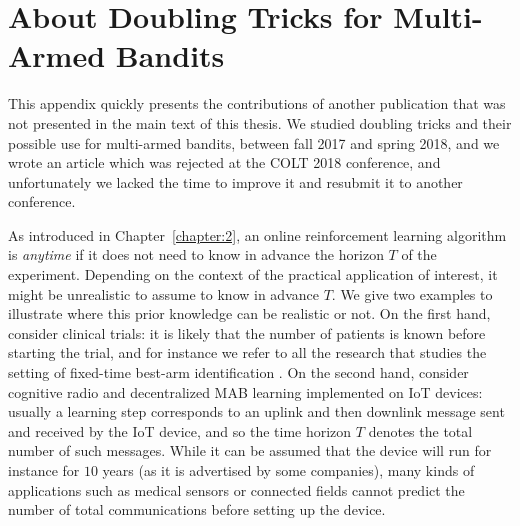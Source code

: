 \chapter{About Doubling Tricks for Multi-Armed Bandits}
\label{app:2:DoublingTricks}

This appendix quickly presents the contributions of another publication that was not presented in the main text of this thesis.
We studied doubling tricks and their possible use for multi-armed bandits, between fall 2017 and spring 2018, and we wrote an article \cite{Besson2018DoublingTricks} which was rejected at the COLT 2018 conference, and unfortunately we lacked the time to improve it and resubmit it to another conference.


As introduced in Chapter~\ref{chapter:2},
an online reinforcement learning algorithm is \emph{anytime} if it does not need to know in advance the horizon $T$ of the experiment.
%
Depending on the context of the practical application of interest, it might be unrealistic to assume to know in advance $T$. We give two examples to illustrate where this prior knowledge can be realistic or not.
On the first hand, consider clinical trials: it is likely that the number of patients is known before starting the trial, and for instance we refer to all the research that studies the setting of fixed-time best-arm identification \cite{audibert2010best,Garivier16BAI}.
On the second hand, consider cognitive radio and decentralized MAB learning implemented on IoT devices: usually a learning step corresponds to an uplink and then downlink message sent and received by the IoT device, and so the time horizon $T$ denotes the total number of such messages. While it can be assumed that the device will run for instance for $10$ years (as it is advertised by some companies), many kinds of applications such as medical sensors or connected fields cannot predict the number of total communications before setting up the device.

